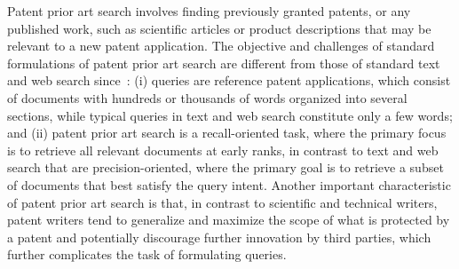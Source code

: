 \begin{comment}
Patents are used by legal entities to legally protect their
inventions and represent a multi-billion dollar industry of licensing
and litigation. In 2013, 302,948 patent applications were approved
in the US alone%
\footnote{http://www.uspto.gov/web/offices/ac/ido/oeip/taf/ us\_stat.htm%
}, a number that has doubled in the past 15 years. Given that a single
existing patent may invalidate a new patent application, helping inventors
assess the patentability of an idea through a patent prior art search
before writing a complete patent application is an important task.
\end{comment}

Patent prior art search involves finding previously granted patents,
or any published work, such as scientific articles or product
descriptions that may be relevant to a new patent application. The
objective and challenges of standard formulations of patent prior art
search are different from those of standard text and web search
since~\cite{magdy2012toward}: (i) queries are reference patent
applications, which consist of documents with hundreds or thousands of
words organized into several sections, while typical queries in text
and web search constitute only a few words; and (ii) patent prior art
search is a recall-oriented task, where the primary focus is to
retrieve all relevant documents at early ranks, in contrast to text
and web search that are precision-oriented, where the primary goal is
to retrieve a subset of documents that best satisfy the query
intent. Another important characteristic of patent prior art search is
that, in contrast to scientific and technical writers, patent writers
tend to generalize and maximize the scope of what is protected by a
patent and potentially discourage further innovation by third parties,
which further complicates the task of formulating queries.

